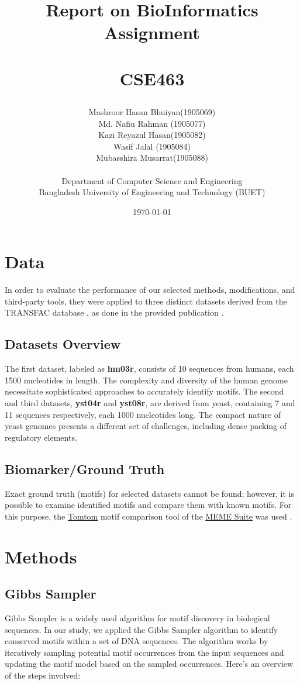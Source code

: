 \documentclass{report}
\title{
	\endgraf\bigskip
	
	\begin{center}
		\Huge {{Report on BioInformatics Assignment} }\\\\
		\vspace{0.5cm}
		\Large {CSE463}
	\end{center}
	\bigskip
	\bigskip
}
\author{
        \large{Mashroor Hasan Bhuiyan(1905069)}\\
        \large{Md. Nafiu Rahman (1905077)}\\
        \large{Kazi Reyazul Hasan(1905082)}\\
	\large{Wasif Jalal (1905084)}\\
        \large{Mubasshira Musarrat(1905088)}\\\\
	\Large{Department of Computer Science and Engineering}\\
        \Large{Bangladesh University of Engineering and Technology (BUET)}
}
\date{
	\endgraf\bigskip
	\Large{\today}
}
\begin{document}
\maketitle
\tableofcontents



\chapter{Data}
In order to evaluate the performance of our selected methods, modifications, and third-party tools, they were applied to three distinct datasets derived from the TRANSFAC database \citep{Matys2003}, as done in the provided publication \citep{Karaboga2018}.

\section{Datasets Overview}
The first dataset, labeled as \textbf{hm03r}, consists of 10 sequences from humans, each 1500 nucleotides in length. The complexity and diversity of the human genome necessitate sophisticated approaches to accurately identify motifs. The second and third datasets, \textbf{yst04r} and \textbf{yst08r}, are derived from yeast, containing 7 and 11 sequences respectively, each 1000 nucleotides long. The compact nature of yeast genomes presents a different set of challenges, including dense packing of regulatory elements.


\section{Biomarker/Ground Truth}
Exact ground truth (motifs) for selected datasets cannot be found; however, it is possible to examine identified motifs and compare them with known motifs. For this purpose, the \href{https://meme-suite.org/meme/tools/tomtom}{Tomtom} motif comparison tool of the \href{https://meme-suite.org/meme/}{MEME Suite} was used \citep{gupta2007quantifying}.

    
\chapter{Methods}
    \section{Gibbs Sampler}
    Gibbs Sampler is a widely used algorithm for motif discovery in biological sequences. In our study, we applied the Gibbs Sampler algorithm to identify conserved motifs within a set of DNA sequences. The algorithm works by iteratively sampling potential motif occurrences from the input sequences and updating the motif model based on the sampled occurrences. Here's an overview of the steps involved: \newline
    
\end{document}
